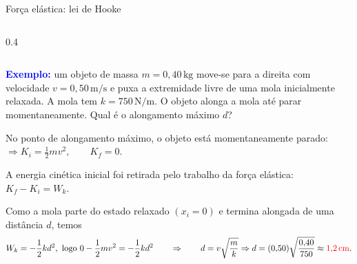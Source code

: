 \documentclass{beamer}
\begin{document}
\begin{frame}{Força elástica: lei de Hooke}
\begin{columns}[T]
\begin{column}{0.4\textwidth}
			\end{column}
		\end{columns}
		
		\textcolor{blue}{\textbf{Exemplo:}} um objeto de massa \(m=0{,}40\,\text{kg}\) move-se para a direita com velocidade \(v=0{,}50\,\text{m/s}\) e puxa a extremidade livre de uma mola inicialmente relaxada. A mola tem \(k=750\,\text{N/m}\). O objeto alonga a mola até parar momentaneamente. Qual é o alongamento máximo \(d\)?
		
		\vspace{0.2cm}
		No ponto de alongamento máximo, o objeto está momentaneamente parado:
		$
		\Rightarrow K_i=\frac12mv^2,\qquad K_f=0.
		$
				\vspace{0.2cm}

		A energia cinética inicial foi retirada pelo trabalho da força elástica:
		$
		K_f-K_i=W_k.
		$
		
		\vspace{0.2cm}
				
		Como a mola parte do estado relaxado \((x_i=0)\) e termina alongada de uma distância \(d\), temos
		\[
		W_k=-\frac12kd^2, \text{ logo }
		0-\frac12mv^2=-\frac12kd^2
		\qquad \Rightarrow \qquad
		d=v\sqrt{\frac{m}{k}} \Rightarrow
		d=(0{,}50)\sqrt{\frac{0{,}40}{750}}
		\approx \textcolor{red}{1{,}2\,\text{cm}}.
		\]
		
	\end{frame}
	
\end{document}
